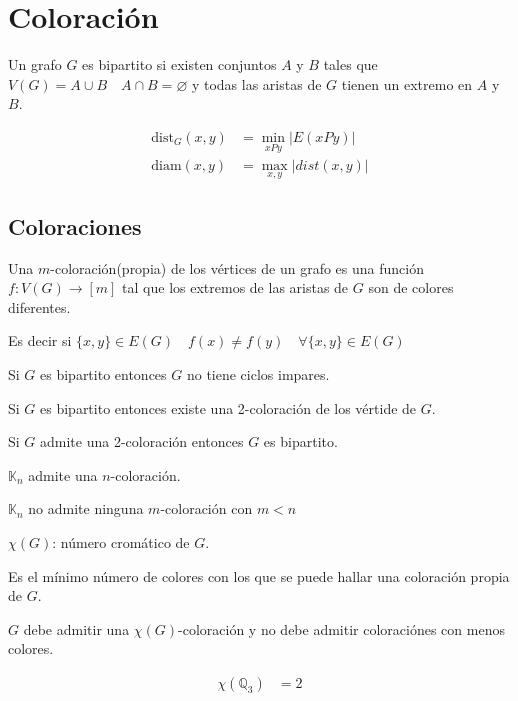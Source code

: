 \documentclass[../main.tex]{subfiles}
\begin{document}
\chapter{Coloración}%

\thispagestyle{fancy}

Un grafo $G$ es bipartito si existen conjuntos $A$ y $B$ tales que
$V(G)=A\cup B \quad A\cap B=\varnothing$ y todas las aristas de $G$ tienen un
extremo en $A$ y $B$.

\begin{align*}
	\text{dist}_G (x,y) &= \min_{xPy}|E(xPy)|\\
	\text{diam} (x,y) &= \max_{x,y}|dist(x,y)|
\end{align*}

\section{Coloraciones}%
\label{sec:coloraciones}

Una $m$-coloración(propia) de los vértices de un grafo es una función
$f:V(G)\longrightarrow[m]$ tal que los extremos de las aristas de $G$ son de
colores diferentes.

Es decir si $\{x,y\}\in E(G)\quad f(x) \neq f(y) \quad\forall \{x,y\}\in E(G)$

\begin{figure}[H]
	\centering
	\boldmath
	
\end{figure}

\teorema
Si $G$ es bipartito entonces $G$ no tiene ciclos impares.

\teorema
Si $G$ es bipartito entonces existe una 2-coloración de los vértide de $G$.

\teorema
Si $G$ admite una 2-coloración entonces $G$ es bipartito.

$\mathbb{K}_n$ admite una $n$-coloración.

$\mathbb{K}_n$ no admite ninguna $m$-coloración con $m<n$


$\chi(G)$: número cromático de $G$.

Es el mínimo número de colores con los que se puede hallar una coloración
propia de $G$.

$G$ debe admitir una $\chi(G)$-coloración y no debe admitir coloraciónes con
menos colores.

\begin{align*}
	\chi(\mathbb{Q}_3) &= 2
\end{align*}
\end{document}
